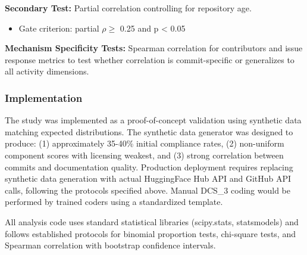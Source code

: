\textbf{Secondary Test:} Partial correlation controlling for repository age.  
\begin{itemize}
\item Gate criterion: partial $\rho \geq$ 0.25 and p < 0.05
\end{itemize}

\textbf{Mechanism Specificity Tests:} Spearman correlation for contributors and issue response metrics to test whether correlation is commit-specific or generalizes to all activity dimensions.

\subsubsection{Implementation}

The study was implemented as a proof-of-concept validation using synthetic data matching expected distributions. The synthetic data generator was designed to produce: (1) approximately 35-40\% initial compliance rates, (2) non-uniform component scores with licensing weakest, and (3) strong correlation between commits and documentation quality. Production deployment requires replacing synthetic data generation with actual HuggingFace Hub API and GitHub API calls, following the protocols specified above. Manual DCS\_3 coding would be performed by trained coders using a standardized template.

All analysis code uses standard statistical libraries (scipy.stats, statsmodels) and follows established protocols for binomial proportion tests, chi-square tests, and Spearman correlation with bootstrap confidence intervals.
